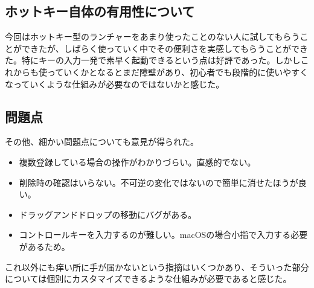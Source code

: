 \subsection{ホットキー自体の有用性について}
今回はホットキー型のランチャーをあまり使ったことのない人に試してもらうことができたが、しばらく使っていく中でその便利さを実感してもらうことができた。特にキーの入力一発で素早く起動できるという点は好評であった。しかしこれからも使っていくかとなるとまだ障壁があり、初心者でも段階的に使いやすくなっていくような仕組みが必要なのではないかと感じた。

\subsection{問題点}
その他、細かい問題点についても意見が得られた。
\begin{itemize}
  \item 複数登録している場合の操作がわかりづらい。直感的でない。
  \item 削除時の確認はいらない。不可逆の変化ではないので簡単に消せたほうが良い。
  \item ドラッグアンドドロップの移動にバグがある。
  \item コントロールキーを入力するのが難しい。macOSの場合小指で入力する必要があるため。
\end{itemize}
これ以外にも痒い所に手が届かないという指摘はいくつかあり、そういった部分については個別にカスタマイズできるような仕組みが必要であると感じた。